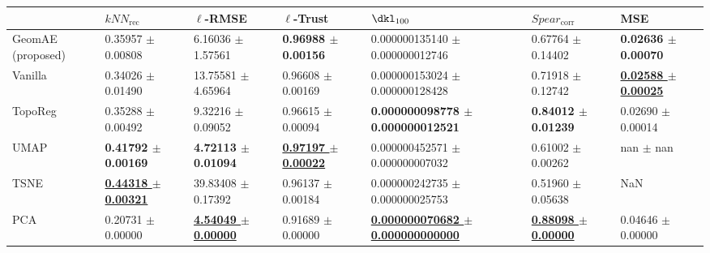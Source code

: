 \begin{tabular}{lllllll}
\toprule
{} &                           $kNN_{\text{rec}}$ &                                  $\ell$-RMSE &                                 $\ell$-Trust &                                               $\dkl_{100}$ &                        $Spear_{\text{corr}}$ &                                          MSE \\
\midrule
GeomAE (proposed) &                        0.35957 $\pm$ 0.00808 &                        6.16036 $\pm$ 1.57561 &               \textbf{0.96988 $\pm$ 0.00156} &                        0.000000135140 $\pm$ 0.000000012746 &                        0.67764 $\pm$ 0.14402 &               \textbf{0.02636 $\pm$ 0.00070} \\
Vanilla           &                        0.34026 $\pm$ 0.01490 &                       13.75581 $\pm$ 4.65964 &                        0.96608 $\pm$ 0.00169 &                        0.000000153024 $\pm$ 0.000000128428 &                        0.71918 $\pm$ 0.12742 &   \underline{\textbf{0.02588 $\pm$ 0.00025}} \\
TopoReg           &                        0.35288 $\pm$ 0.00492 &                        9.32216 $\pm$ 0.09052 &                        0.96615 $\pm$ 0.00094 &               \textbf{0.000000098778 $\pm$ 0.000000012521} &               \textbf{0.84012 $\pm$ 0.01239} &                        0.02690 $\pm$ 0.00014 \\
UMAP              &               \textbf{0.41792 $\pm$ 0.00169} &               \textbf{4.72113 $\pm$ 0.01094} &   \underline{\textbf{0.97197 $\pm$ 0.00022}} &                        0.000000452571 $\pm$ 0.000000007032 &                        0.61002 $\pm$ 0.00262 &                                nan $\pm$ nan \\
TSNE              &   \underline{\textbf{0.44318 $\pm$ 0.00321}} &                       39.83408 $\pm$ 0.17392 &                        0.96137 $\pm$ 0.00184 &                        0.000000242735 $\pm$ 0.000000025753 &                        0.51960 $\pm$ 0.05638 &                                          NaN \\
PCA               &                        0.20731 $\pm$ 0.00000 &   \underline{\textbf{4.54049 $\pm$ 0.00000}} &                        0.91689 $\pm$ 0.00000 &   \underline{\textbf{0.000000070682 $\pm$ 0.000000000000}} &   \underline{\textbf{0.88098 $\pm$ 0.00000}} &                        0.04646 $\pm$ 0.00000 \\
\bottomrule
\end{tabular}
